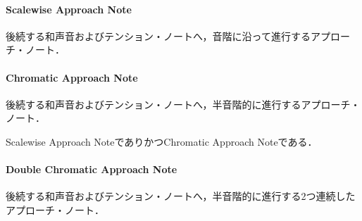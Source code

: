 \documentclass[dvipdfmx,uplatex,b5paper,openany,jbase=12Q,nomag*,textwidth-limit=44%
               ]{gachimuchi}[2020/05/05]
\begin{document}
\paragraph{Scalewise Approach Note}
後続する和声音およびテンション・ノートへ，音階に沿って進行するアプローチ・ノート．
\begin{Music}
  \nostartrule%
  \Startpiece%
  \znotes%
  \en\Notes
  \zchordsu{\Cross}\zchordsu{\Cross}%
  \en\NOTes%
  \en\doublebar
  \Notes
  \zchordsu{\Cross}\zchordsu{\Cross}%
  \en\NOtes%
  \zchordsu{\Cross}%
  \en\doublebar
  \Notes
  \zchordsu{\Cross}\zchordsu{\Cross}%
  \en\NOTes%
  \en\setdoublebar
  \endpiece%
\end{Music}
\paragraph{Chromatic Approach Note}
後続する和声音およびテンション・ノートへ，半音階的に進行するアプローチ・ノート．
\begin{Music}
  \nostartrule%
  \Startpiece%
  \znotes%
  \en\Notes
  \zchordsu{\Cross}\zchordsu{\Cross}%
  \en\NOTes%
  \en\doublebar
  \Notes
  \zchordsu{\Cross}\zchordsu{\Cross}%
  \en\NOtes%
  \zchordsu{\Cross}%
  \en\doublebar
  \Notes
  \zchordsu{\Cross}\zchordsu{\Cross}%
  \en\NOTes%
  \en\setdoublebar
  \endpiece%
\end{Music}
\begin{chuui}
Scalewise Approach NoteでありかつChromatic Approach Noteである．
\end{chuui}
\paragraph{Double Chromatic Approach Note}
後続する和声音およびテンション・ノートへ，半音階的に進行する2つ連続したアプローチ・ノート．
\begin{Music}
  \nostartrule%
  \Startpiece%
  \znotes%
  \en\Notes
  \zchordsu{\Cross}\zchordsu{\Cross}%
  \en\NOTes%
  \en\doublebar
  \Notes
  \zchordsu{\Cross}\zchordsu{\Cross}%
  \zchordsu{\Cross}\zchordsu{\Cross}%
  \en\NOtes%
  \en\doublebar
  \NOtes
  \en\Notes
  \zchordsu{\Cross}\zchordsu{\Cross}%
  \en\NOTes%
  \en\setdoublebar
  \endpiece%
\end{Music}
\end{document}
